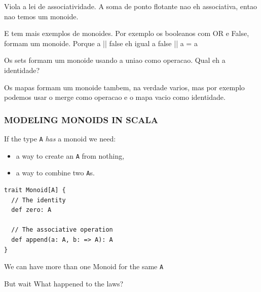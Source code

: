 \documentclass{beamer}
\begin{document}
\begin{frame}
{    \hrulefill

    Viola a lei de associatividade. A soma de ponto flotante nao eh associativa,
    entao nao temos um monoide.

    \hrulefill

   E tem mais exemplos de monoides. Por exemplo os booleanos com OR e False,
   formam um monoide. Porque a || false eh igual a false || a = a

   Os sets formam um monoide usando a uniao como operacao. Qual eh a identidade?

   Os mapas formam um monoide tambem, na verdade varios, mas por exemplo podemos
   usar o merge como operacao e o mapa vacio como identidade.
  }
  \end{frame}

\begin{frame}[fragile]\frametitle{MODELING MONOIDS IN SCALA}
  If the type \texttt{A} \emph{has} a monoid we need:
  \begin{itemize}
    \item a way to create an \texttt{A} from nothing,
    \item a way to combine two \texttt{A}s.
  \end{itemize}
  \pause

  \begin{block}{}
  \begin{lstlisting}
trait Monoid[A] {
  // The identity
  def zero: A

  // The associative operation
  def append(a: A, b: => A): A
}
  \end{lstlisting}
  \end{block}

  \pause

  We can have more than one Monoid for the same \texttt{A}
  \begin{block}{But wait}
    What happened to the laws?
  \end{block}

\end{frame}
\end{document}
